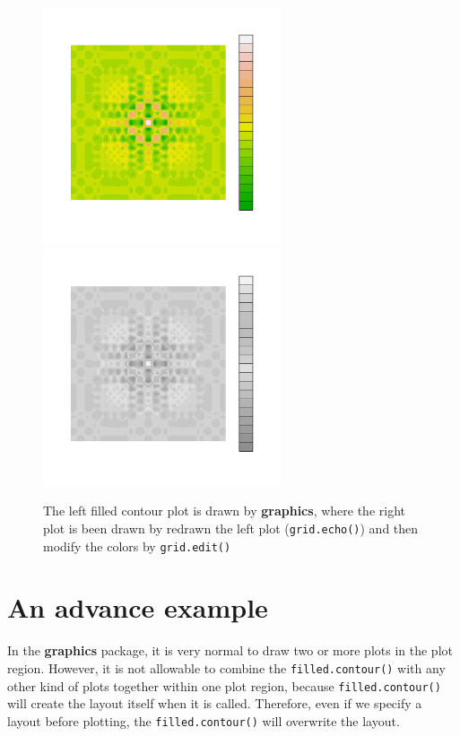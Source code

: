 \documentclass[11pt,twoside]{report}
\begin{document}
\begin{figure}[h!]
	\begin{center}
		\includegraphics[height = 7cm, width = 7cm]{figure/Chapter6_example_2_2.pdf}
		\includegraphics[height = 7cm, width = 7cm]{figure/Chapter6_example_2_4.pdf}
		\caption{The left filled contour plot is drawn by \textbf{graphics}, where the right plot is been drawn by redrawn the left plot (\texttt{grid.echo()}) and then modify the colors by \texttt{grid.edit()}}
		\label{Example_6.1}
	\end{center}
\end{figure}

\newpage
\section{An advance example}
In the \textbf{graphics} package, it is very normal to draw two or more plots in the plot region. However, it is not allowable to combine the \texttt{filled.contour()} with any other kind of plots together within one plot region, because \texttt{filled.contour()} will create the layout itself when it is called. Therefore, even if we specify a layout before plotting, the \texttt{filled.contour()} will overwrite the layout.\\
\end{document}

